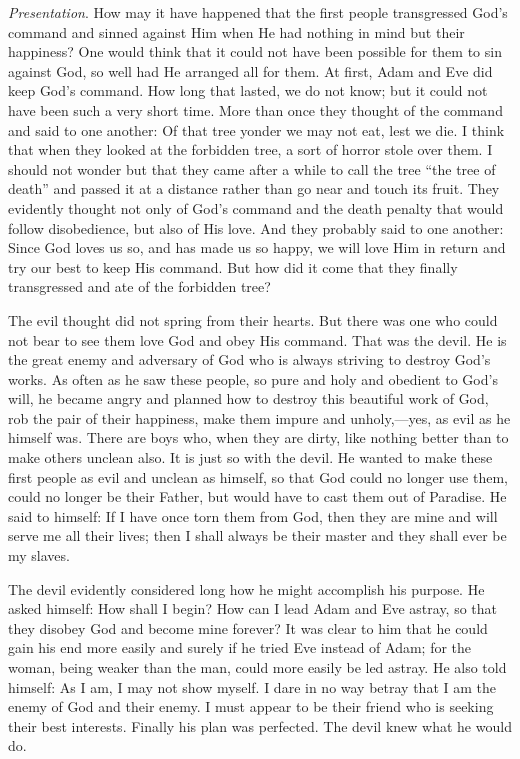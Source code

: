 \emph{Presentation}. How may it have happened that the first people transgressed God’s command and sinned against Him when He had nothing in mind but their happiness? One would think that it could not have been possible for them to sin against God, so well had He arranged all for them. At first, Adam and Eve did keep God’s command. How long that lasted, we do not know; but it
could not have been such a very short time. More than once they thought of the command and said to one another: Of that tree yonder we may not eat, lest we die. I think that when they looked at the forbidden tree, a sort of horror stole over them. I should not wonder but that they came after a while to call the tree “the tree of death” and passed it at a distance rather than go near and touch its fruit. They evidently thought not only of God’s command and the death penalty that would follow disobedience, but also of His love. And they probably said to one another: Since God loves us so, and has made us so happy, we will love Him in return and try our best to keep His command. But how did it come that they finally transgressed and ate of the forbidden tree?

The evil thought did not spring from their hearts. But there was one who could not bear to see them love God and obey His command. That was the devil. He is the great enemy and adversary of God who is always striving to destroy God’s works. As often as he saw these people, so pure and holy and obedient to God’s will, he became angry and planned how to destroy this beautiful work of God, rob the pair of their happiness, make them impure and unholy,—yes, as evil as he himself was. There are boys who, when they are dirty, like nothing better than to make others unclean also. It is just so with the devil. He wanted to make these first people as evil and unclean as himself, so that God could no longer use them, could no longer be their Father, but would have to cast them out of Paradise. He said to himself: If I have once torn them from God, then they are mine and will serve me all their lives; then I shall always be their master and they shall ever be my slaves.

The devil evidently considered long how he might accomplish his purpose. He asked himself: How shall I begin? How can I lead Adam and Eve astray, so that they disobey God and become mine forever? It was clear to him that he could gain his end more easily and surely if he tried Eve instead of Adam; for the woman, being weaker than the man, could more easily be led astray. He also told himself: As I am, I may not show myself. I dare in no way betray that I am the enemy of God and their enemy. I must appear to be their friend who is seeking their best interests. Finally his plan was perfected. The devil knew what he would do.

